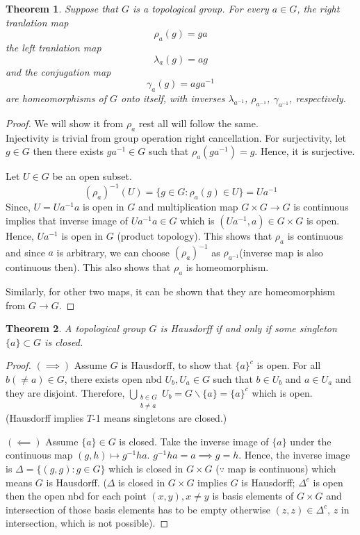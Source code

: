 \documentclass[12pt,reqno]{amsart}
\theoremstyle{plain}
\newtheorem{thm}{Theorem}
\theoremstyle{definition}
\begin{document}
\begin{thm}
    Suppose that $G$ is a topological group. For every $a \in G$, the {\it right tranlation map}
    $$ \rho_a(g) = ga$$
    the {\it left tranlation map}
    $$ \lambda_a(g) = ag$$
    and the {\it conjugation map}
    $$ \gamma_a(g) = aga^{-1}$$
    are homeomorphisms of $G$ onto itself, with inverses $\lambda_{a^{-1}}$, $\rho_{a^{-1}}$, $\gamma_{a^{-1}}$, respectively.
\end{thm}
\begin{proof}
    We will show it from $\rho_a$ rest all will follow the same.\\
    Injectivity is trivial from group operation right cancellation. For surjectivity, let $g \in G$ then there exists $ga^{-1}\in G$ such that $\rho_a(ga^{-1}) = g$. Hence, it is surjective.

    Let $U \in G$ be an open subset. 
    $$ (\rho_a)^{-1}(U) = \{g \in G \colon \rho_a(g) \in U\} = Ua^{-1}$$
    Since, $U = Ua^{-1}a$ is open in $G$ and multiplication map $G \times G \to G$ is continuous implies that inverse image of $Ua^{-1}a \in G$ which is $(Ua^{-1},a) \in G \times G$ is open. Hence, $Ua^{-1}$ is open in $G$ (product topology). This shows that $\rho_a$ is continuous and since $a$ is arbitrary, we can choose $(\rho_a)^{-1}$ as $\rho_{a^{-1}}$(inverse map is also continuous then). This also shows that $\rho_a$ is homeomorphism.

    Similarly, for other two maps, it can be shown that they are homeomorphism from $G \to G$.
\end{proof}

\begin{thm}
    A topological group $G$ is Hausdorff if and only if some singleton $\{a\} \subset G$ is closed.
\end{thm}
\begin{proof}
    $(\implies)$ Assume $G$ is Hausdorff, to show that $\{a\}^c$ is open. For all $b(\neq a) \in G$, there exists open nbd $U_b, U_a\in G$ such that $b \in U_b$ and $a \in U_a$ and they are disjoint. Therefore, $\bigcup\limits_{\substack{b\in G \\ b \neq a}} U_b = G\backslash\{a\} = \{a\}^c$ which is open. (Hausdorff implies $T$-1 means singletons are closed.)

    \noindent $(\impliedby)$ Assume $\{a\} \in G$ is closed. Take the inverse image of $\{a\}$ under the continuous map $(g,h) \mapsto g^{-1}ha$. $g^{-1}ha = a \implies g = h$. Hence, the inverse image is $\Delta = \{(g,g) \colon g \in G\}$ which is closed in $G \times G$ ($\because$ map is continuous) which means $G$ is Hausdorff. ($\Delta$ is closed in $G \times G$ implies $G$ is Hausdorff; $\Delta^c$ is open then the open nbd for each point $(x,y), x \neq y$ is basis elements of $G \times G$ and intersection of those basis elements has to be empty otherwise $(z,z) \in \Delta^c$, $z$ in intersection, which is not possible).
\end{proof}
\end{document}
